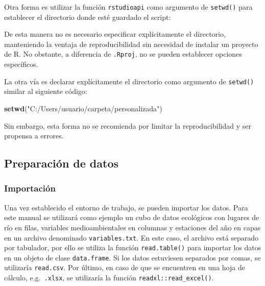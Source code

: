 \documentclass[
  spanish,
]{article}
\newenvironment{Shaded}{\begin{snugshade}}{\end{snugshade}}
\newcommand{\CommentTok}[1]{\textcolor[rgb]{0.56,0.35,0.01}{\textit{#1}}}
\newcommand{\KeywordTok}[1]{\textcolor[rgb]{0.13,0.29,0.53}{\textbf{#1}}}
\newcommand{\NormalTok}[1]{#1}
\newcommand{\OperatorTok}[1]{\textcolor[rgb]{0.81,0.36,0.00}{\textbf{#1}}}
\newcommand{\StringTok}[1]{\textcolor[rgb]{0.31,0.60,0.02}{#1}}
\begin{document}
Otra forma es utilizar la función \texttt{rstudioapi} como argumento de \texttt{setwd()} para establecer el directorio donde esté guardado el script:

\begin{Shaded}
\end{Shaded}

De esta manera no es necesario especificar explícitamente el directorio, manteniendo la ventaja de reproducibilidad sin necesidad de instalar un proyecto de R. No obstante, a diferencia de \texttt{.Rproj}, no se pueden establecer opciones específicos.

La otra vía es declarar explícitamente el directorio como argumento de \texttt{setwd()} similar al siguiente código:

\begin{Shaded}
\begin{Highlighting}[]
\KeywordTok{setwd}\NormalTok{(}\StringTok{"C:/Users/usuario/carpeta/personalizada"}\NormalTok{)}
\end{Highlighting}
\end{Shaded}

Sin embargo, esta forma no se recomienda por limitar la reproducibilidad y ser propensa a errores.

\hypertarget{preparaciuxf3n-de-datos}{%
\subsection{Preparación de datos}\label{preparaciuxf3n-de-datos}}

\hypertarget{importaciuxf3n}{%
\subsubsection{Importación}\label{importaciuxf3n}}

Una vez establecido el entorno de trabajo, se pueden importar los datos. Para este manual se utilizará como ejemplo un cubo de datos ecológicos con lugares de río en filas, variables medioambientales en columnas y estaciones del año en capas en un archivo denominado \texttt{variables.txt}. En este caso, el archivo está separado por tabulador, por ello se utiliza la función \texttt{read.table()} para importar los datos en un objeto de clase \texttt{data.frame}. Si los datos estuviesen separados por comas, se utilizaría \texttt{read.csv}. Por último, en caso de que se encuentren en una hoja de cálculo, e.g.~\texttt{.xlsx}, se utilizaría la función \texttt{readxl::read\_excel()}.
\end{document}

